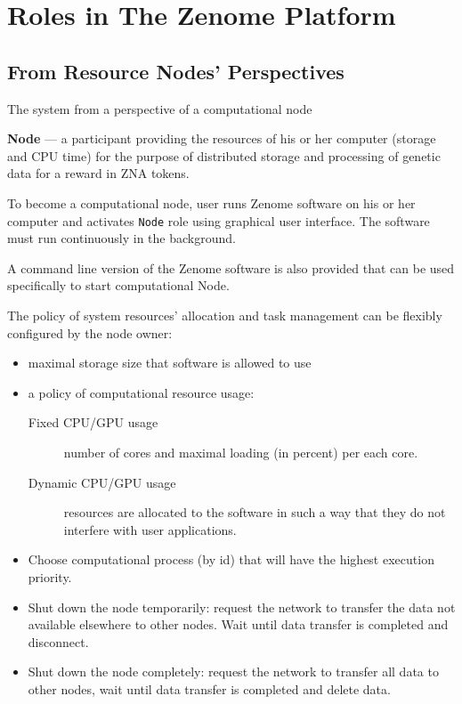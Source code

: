 \section{Roles in The Zenome Platform}
\subsection{From Resource Nodes’ Perspectives}

The system from a perspective of a computational node

\textbf{Node} --- a participant providing the resources of his or her computer (storage and CPU time) for the purpose of distributed storage and processing of genetic data for a reward in ZNA tokens.

To become a computational node, user runs Zenome software on his or her computer and activates \verb|Node| role using graphical user interface. The software must run continuously in the background.

\begin{note}
  A command line version of the Zenome software is also provided that can be used specifically to start computational Node.
\end{note}

The policy of system resources’ allocation and task management can be flexibly configured by the node owner:
\begin{itemize}
  \item maximal storage size that software is allowed to use

  \item a policy of computational resource usage:
  \begin{description}
    \item [Fixed CPU/GPU usage] number of cores and maximal loading (in percent) per each core.
    \item [Dynamic CPU/GPU usage] resources are allocated to the software in such a way that they do not interfere with user applications.
  \end{description}

  \item Choose computational process (by id) that will have the highest execution priority.

  \item Shut down the node temporarily: request the network to transfer the data not available elsewhere to other nodes. Wait until data transfer is completed and disconnect.

  \item Shut down the node completely: request the network to transfer all data to other nodes, wait until data transfer is completed and delete data.
\end{itemize}



